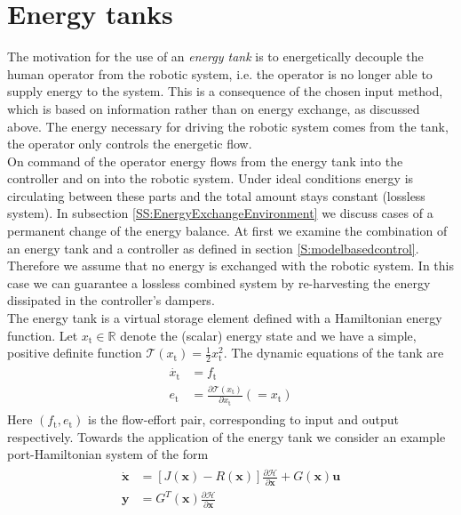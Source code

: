\documentclass[a4paper,twoside, openright,12pt]{report}
\newcommand{\f}[1]{\boldsymbol{#1}}
\newcommand{\g}[1]{\text{#1}}
\begin{document}
{\section{Energy tanks}\label{S:EnergyTanks}
The motivation for the use of an \emph{energy tank} is to energetically decouple the human operator from the robotic system, i.e. the operator is no longer able to supply energy to the system. This is a consequence of the chosen input method, which is based on information rather than on energy exchange, as discussed above. The energy necessary for driving the robotic system comes from the tank, the operator only controls the energetic flow.\\
On command of the operator energy flows from the energy tank into the controller and on into the robotic system. Under ideal conditions energy is circulating between these parts and the total amount stays constant (lossless system). In subsection \ref{SS:EnergyExchangeEnvironment} we discuss cases of a permanent change of the energy balance. At first we examine the combination of an energy tank and a controller as defined in section \ref{S:modelbasedcontrol}. Therefore we assume that no energy is exchanged with the robotic system. In this case we can guarantee a lossless combined system by re-harvesting the energy dissipated in the controller's dampers. \\ 
The energy tank is a virtual storage element defined with a Hamiltonian energy function. Let $x_\g{t} \in \mathbb{R}$ denote the (scalar) energy state and we have a simple, positive definite function $\mathcal{T}(x_\g{t}) = \frac{1}{2}x_\g{t}^2$. The dynamic equations of the tank are
\begin{eqnarray}
\begin{aligned}
\dot{x_\g{t}} &= f_\g{t} \\
e_\g{t} &= \frac{\partial \mathcal{T}(x_\g{t})}{\partial x_\g{t}} (=x_\g{t})
\end{aligned}
\end{eqnarray}
Here $(f_\g{t},e_\g{t})$ is the flow-effort pair, corresponding to input and output respectively. Towards the application of the energy tank we consider an example port-Hamiltonian system of the form
\begin{eqnarray}
\begin{aligned}
\dot{\f{x}} &= [J(\f{x}) - R(\f{x})] \frac{\partial \mathcal{H}}{\partial \f{x}} + G(\f{x})\f{u} \\
\f{y} &= G^T(\f{x}) \frac{\partial \mathcal{H}}{\partial \f{x}}
\end{aligned}

\end{eqnarray}}
\end{document}
